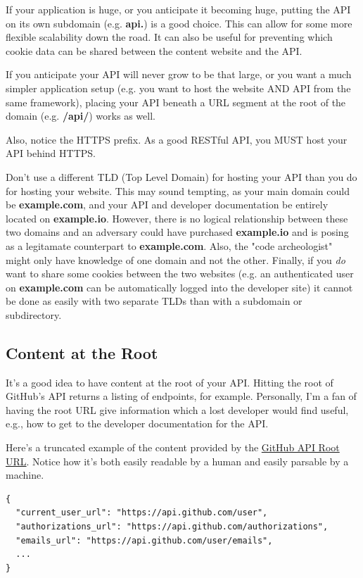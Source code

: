 \documentclass{book}
\begin{document}
If your application is huge, or you anticipate it becoming huge, putting the API on its own subdomain (e.g. \textbf{api.}) is a good choice. This can allow for some more flexible scalability down the road. It can also be useful for preventing which cookie data can be shared between the content website and the API.

If you anticipate your API will never grow to be that large, or you want a much simpler application setup (e.g. you want to host the website AND API from the same framework), placing your API beneath a URL segment at the root of the domain (e.g. \textbf{/api/}) works as well.

Also, notice the HTTPS prefix. As a good RESTful API, you MUST host your API behind HTTPS.

Don't use a different TLD (Top Level Domain) for hosting your API than you do for hosting your website. This may sound tempting, as your main domain could be \textbf{example.com}, and your API and developer documentation be entirely located on \textbf{example.io}. However, there is no logical relationship between these two domains and an adversary could have purchased \textbf{example.io} and is posing as a legitamate counterpart to \textbf{example.com}. Also, the "code archeologist" might only have knowledge of one domain and not the other. Finally, if you \emph{do} want to share some cookies between the two websites (e.g. an authenticated user on \textbf{example.com} can be automatically logged into the developer site) it cannot be done as easily with two separate TLDs than with a subdomain or subdirectory.

\subsection{Content at the Root}

It's a good idea to have content at the root of your API. Hitting the root of GitHub's API returns a listing of endpoints, for example. Personally, I'm a fan of having the root URL give information which a lost developer would find useful, e.g., how to get to the developer documentation for the API.

Here's a truncated example of the content provided by the \href{https://api.github.com/}{GitHub API Root URL}. Notice how it's both easily readable by a human and easily parsable by a machine.

\begin{verbatim}
{
  "current_user_url": "https://api.github.com/user",
  "authorizations_url": "https://api.github.com/authorizations",
  "emails_url": "https://api.github.com/user/emails",
  ...
}
\end{verbatim}
\end{document}
